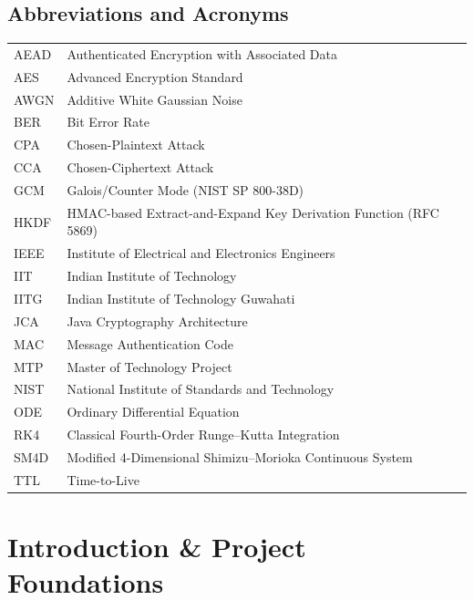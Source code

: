 \documentclass[12pt,a4paper,oneside]{report}
\begin{document}
\section*{Abbreviations and Acronyms}
\noindent\begin{tabular}{@{}p{3.2cm}p{11.5cm}@{}}
AEAD & Authenticated Encryption with Associated Data \\
AES & Advanced Encryption Standard \\
AWGN & Additive White Gaussian Noise \\
BER & Bit Error Rate \\
CPA & Chosen-Plaintext Attack \\
CCA & Chosen-Ciphertext Attack \\
GCM & Galois/Counter Mode (NIST SP 800-38D) \\
HKDF & HMAC-based Extract-and-Expand Key Derivation Function (RFC 5869) \\
IEEE & Institute of Electrical and Electronics Engineers \\
IIT & Indian Institute of Technology \\
IITG & Indian Institute of Technology Guwahati \\
JCA & Java Cryptography Architecture \\
MAC & Message Authentication Code \\
MTP & Master of Technology Project \\
NIST & National Institute of Standards and Technology \\
ODE & Ordinary Differential Equation \\
RK4 & Classical Fourth-Order Runge--Kutta Integration \\
SM4D & Modified 4-Dimensional Shimizu--Morioka Continuous System \\
TTL & Time-to-Live
\end{tabular}

\newpage
{}
\setcounter{page}{1}

\chapter{Introduction \& Project Foundations}
\end{document}
